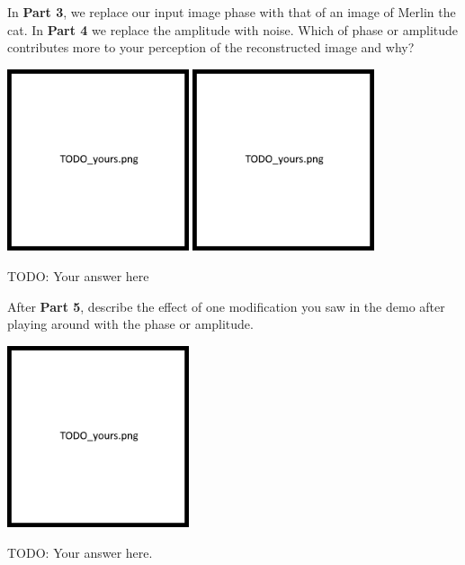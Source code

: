 \documentclass{csci1430}
\begin{document}
\newpage

\begin{subquestion}[points=2]
In \textbf{Part 3}, we replace our input image phase with that of an image of Merlin the cat. In \textbf{Part 4} we replace the amplitude with noise. 
Which of phase or amplitude contributes more to your perception of the reconstructed image and why?
\end{subquestion}

\begin{answer}[height=16]
\includegraphics[width=0.4\textwidth,keepaspectratio]{images/TODO_yours.png}
\includegraphics[width=0.4\textwidth,keepaspectratio]{images/TODO_yours.png}

TODO: Your answer here
\end{answer}

\begin{subquestion}[points=2]
After \textbf{Part 5}, describe the effect of one modification you saw in the demo after playing around with the phase or amplitude.
\end{subquestion}

\begin{answer}[height=16]
\includegraphics[width=0.4\textwidth,keepaspectratio]{images/TODO_yours.png}
    
TODO: Your answer here.
\end{answer}
\end{document}
